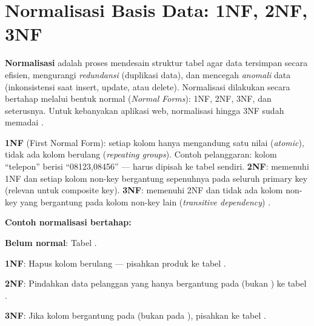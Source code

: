 \section{Normalisasi Basis Data: 1NF, 2NF, 3NF}

\textbf{Normalisasi} adalah proses mendesain struktur tabel agar data tersimpan secara efisien, mengurangi \textit{redundansi} (duplikasi data), dan mencegah \textit{anomali} data (inkonsistensi saat insert, update, atau delete). Normalisasi dilakukan secara bertahap melalui bentuk normal (\textit{Normal Forms}): 1NF, 2NF, 3NF, dan seterusnya. Untuk kebanyakan aplikasi web, normalisasi hingga 3NF sudah memadai \cite{mysqlDocs}.

\textbf{1NF} (First Normal Form): setiap kolom hanya mengandung satu nilai (\textit{atomic}), tidak ada kolom berulang (\textit{repeating groups}). Contoh pelanggaran: kolom ``telepon'' berisi ``08123,08456'' --- harus dipisah ke tabel sendiri. \textbf{2NF}: memenuhi 1NF dan setiap kolom non-key bergantung sepenuhnya pada seluruh primary key (relevan untuk composite key). \textbf{3NF}: memenuhi 2NF dan tidak ada kolom non-key yang bergantung pada kolom non-key lain (\textit{transitive dependency}) \cite{mysqlGettingStarted}.

\begin{contoh}
\textbf{Contoh normalisasi bertahap:}

\textbf{Belum normal}: Tabel .

\textbf{1NF}: Hapus kolom berulang --- pisahkan produk ke tabel .

\textbf{2NF}: Pindahkan data pelanggan yang hanya bergantung pada  (bukan ) ke tabel .

\textbf{3NF}: Jika kolom  bergantung pada  (bukan pada ), pisahkan ke tabel .
\end{contoh}

